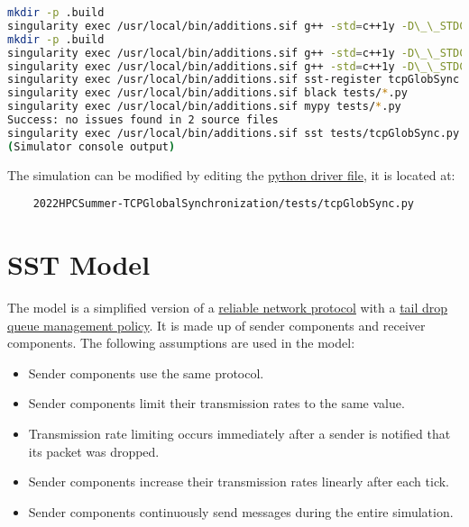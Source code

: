 \documentclass{article}
\begin{document}
\begin{lstlisting}[language=bash, frame=none]
mkdir -p .build
singularity exec /usr/local/bin/additions.sif g++ -std=c++1y -D\_\_STDC\_FORMAT\_MACROS -fPIC -DHAVE\_CONFIG\_H -I/opt/SST/11.1.0/include -MMD -c receiver.cc -o .build/receiver.o
mkdir -p .build
singularity exec /usr/local/bin/additions.sif g++ -std=c++1y -D\_\_STDC\_FORMAT\_MACROS -fPIC -DHAVE\_CONFIG\_H -I/opt/SST/11.1.0/include -MMD -c sender.cc -o .build/sender.o
singularity exec /usr/local/bin/additions.sif g++ -std=c++1y -D\_\_STDC\_FORMAT\_MACROS -fPIC -DHAVE\_CONFIG\_H -I/opt/SST/11.1.0/include -shared -fno-common -Wl,-undefined -Wl,dynamic\_lookup -o libtcpGlobSync.so .build/receiver.o .build/sender.o
singularity exec /usr/local/bin/additions.sif sst-register tcpGlobSync tcpGlobSync\_LIBDIR=/home/{USER}/sst-work/2022HPCSummer-TCPGlobalSynchronization
singularity exec /usr/local/bin/additions.sif black tests/*.py
singularity exec /usr/local/bin/additions.sif mypy tests/*.py
Success: no issues found in 2 source files
singularity exec /usr/local/bin/additions.sif sst tests/tcpGlobSync.py
(Simulator console output)
\end{lstlisting}

\noindent The simulation can be modified by editing the \href{http://sst-simulator.org/SSTPages/SSTUserPythonFileFormat/}{python driver file}, it is located at:

\begin{verbatim}
	2022HPCSummer-TCPGlobalSynchronization/tests/tcpGlobSync.py
\end{verbatim}

\section{SST Model}

The model is a simplified version of a \href{https://en.wikipedia.org/wiki/Reliability_(computer_networking)}{reliable network protocol} with a \href{https://en.wikipedia.org/wiki/Tail_drop}{tail drop queue management policy}. It is made up of sender components and receiver components. The following assumptions are used in the model:

\begin{itemize}
	\item Sender components use the same protocol.
	\item Sender components limit their transmission rates to the same value.
	\item Transmission rate limiting occurs immediately after a sender is notified that its packet was dropped.
	\item Sender components increase their transmission rates linearly after each tick.
	\item Sender components continuously send messages during the entire simulation.
\end{itemize}
\end{document}
